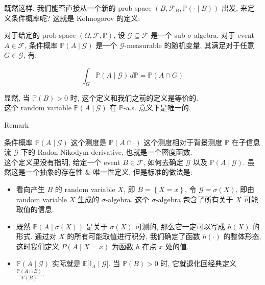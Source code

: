既然这样, 我们能否直接从一个新的 prob space \((\mathit{B},\mathcal{F}_{\mathit{B}},\mathbb{P}( \cdot \mid \mathit{B}))\) 出发, 来定义条件概率呢? 这就是 Kolmogorov 的定义:

\begin{definition}{}

对于给定的 prob space \((\Omega,\mathcal{F},\mathbb{P})\), 设 \(\mathcal{G} \subseteq \mathcal{F}\) 是一个 sub-\(\mathit{\sigma}\)-algebra. 对于 event \(\mathit{A} \in \mathcal{F}\), 条件概率 \(\mathbb{P}(\mathit{A} \mid \mathcal{G})\) 是一个 \(\mathcal{G}\)-measurable 的随机变量, 其满足对于任意 \(\mathit{G} \in \mathcal{G}\), 有:

\[\int_{\mathit{G}}\mathbb{P}(\mathit{A} \mid \mathcal{G})\,\mathit{d}\mathbb{P} = \mathbb{P}(\mathit{A} \cap \mathit{G})\]

显然, 当 \(\mathbb{P}(\mathit{B}) > 0\) 时, 这个定义和我们之前的定义是等价的.\\
这个 random variable \(\mathbb{P}(\mathit{A} \mid \mathcal{G})\) 在 \(\mathbb{P}\)-a.s. 意义下是唯一的.

\end{definition}

\begin{qlremark}{Remark}

条件概率 \(\mathbb{P}(\mathit{A} \mid \mathcal{G})\) 这个测度是 \(\mathbb{P}(\mathit{A} \cap \cdot )\) 这个测度相对于背景测度 \(\mathbb{P}\) 在子信息流 \(\mathcal{G}\) 下的 Radon-Nikodym derivative, 也就是一个密度函数.\\
这个定义里没有指明, 给定一个 event \(\mathit{B} \in \mathcal{F}\), 如何去确定 \(\mathcal{G}\) 以及 \(\mathbb{P}(\mathit{A} \mid \mathcal{G})\). 虽然这是一个抽象的存在性 \& 唯一性定义, 但是标准的做法是:

\begin{itemize}
\item
  看向产生 \(\mathit{B}\) 的 random variable \(\mathit{X}\), 即 \(\mathit{B} = \left\{ {\mathit{X} = \mathit{x}} \right\}\), 令 \(\mathcal{G} = \mathit{\sigma}(\mathit{X})\), 即由 random variable \(\mathit{X}\) 生成的 \(\mathit{\sigma}\)-algebra. 这个 \(\mathit{\sigma}\)-algebra 包含了所有关于 \(\mathit{X}\) 可能取值的信息.
\item
  既然 \(\mathbb{P}(\mathit{A} \mid \mathit{\sigma}(\mathit{X}))\) 是关于 \(\mathit{\sigma}(\mathit{X})\) 可测的, 那么它一定可以写成 \(h(\mathit{X})\) 的形式. 通过对 \(\mathit{X}\) 的所有可能取值进行积分, 我们确定了函数 \(h( \cdot )\) 的整体形态, 这时我们定义 \(\mathit{P}(\mathit{A} \mid \mathit{X} = \mathit{x})\) 为函数 \(h\) 在点 \(\mathit{x}\) 处的值.
\item
  \(\mathbb{P}(\mathit{A} \mid \mathcal{G})\) 实际就是  \(\mathbb{E}\lbrack\mathbb{I}_{\mathit{A}} \mid \mathcal{G}\rbrack\). 当 \(\mathbb{P}(\mathit{B}) > 0\) 时, 它就退化回经典定义 \(\frac{\mathbb{P}(\mathit{A} \cap \mathit{B})}{\mathbb{P}(\mathit{B})}\).
\end{itemize}

\end{qlremark}

